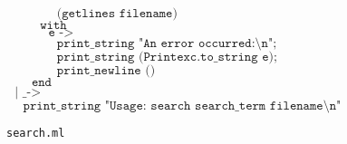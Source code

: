 \documentclass[]{book}
\begin{document}
\begin{figure}
\begin{center}
{\begin{minipage}{0.9\textwidth}
$\texttt{~~~~~~~~~~~~(getlines filename)}$\\
$\texttt{~~~~~~~~with}$\\
$\texttt{~~~~~~~~~~e ->}$\\
$\texttt{~~~~~~~~~~~~print\_string "An error occurred:\textbackslash n";}$\\
$\texttt{~~~~~~~~~~~~print\_string (Printexc.to\_string e);}$\\
$\texttt{~~~~~~~~~~~~print\_newline ()}$\\
$\texttt{~~~~~~end}$\\
$\texttt{~~| \_ ->}$\\
$\texttt{~~~~print\_string "Usage:\ search search\_term filename\textbackslash n"}$\vphantom{g}
\end{minipage}}
\end{center}
\caption{\small\texttt{search.ml}}
\label{search.ml}
\end{figure}


\cleardoublepage
\flushbottom
\end{document}
